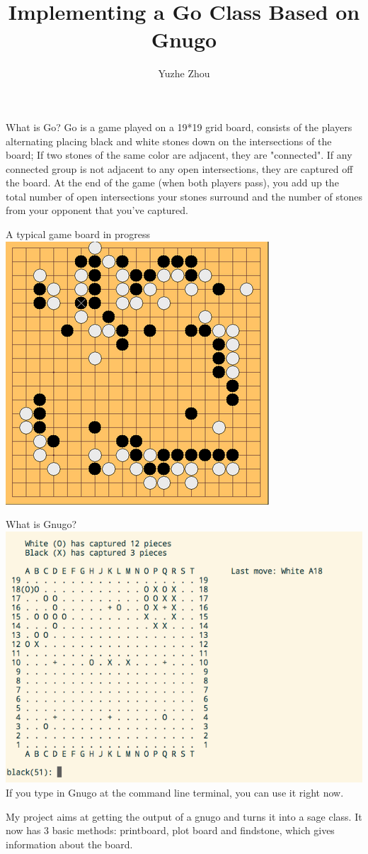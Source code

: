 \documentclass{beamer}
\title{Implementing a Go Class Based on Gnugo}
\author{Yuzhe Zhou}
\begin{document}
\begin{frame}
\titlepage

\end{frame}

\begin{frame}
What is Go? Go is a game played on a 19*19 grid board, consists of the players alternating placing black and white stones down on the intersections of the board; If two stones of the same color are adjacent, they are "connected". If any connected group is not adjacent to any open intersections, they are captured off the board.
At the end of the game (when both players pass), you add up the total
number of open intersections your stones surround and the number of
stones from your opponent that you've captured.

\end{frame}

\begin{frame}
A typical game board in progress
\includegraphics[scale = 0.45]{Go.png}
\end{frame}

\begin{frame}
What is Gnugo?
\includegraphics[scale = 0.45]{Gnugo.png}
If you type in Gnugo at the command line terminal, you can use it right now.

\end{frame}

\begin{frame}
My project aims at getting the output of a gnugo and turns it into a sage class. It now has 3 basic methods:
printboard, plot board and findstone, which gives information about the board. 
\end{frame}
\end{document}
